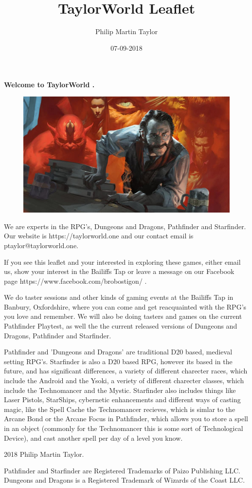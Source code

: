 \documentclass[12pt,a4paper]{book}
\date{07-09-2018}
\author{Philip Martin Taylor}
\title{TaylorWorld Leaflet}
\begin{document}
\begin{center}
\textbf{Welcome to TaylorWorld \texttrademark.}
\end{center}
\begin{figure}[h]
  \centering
  \includegraphics[scale=0.15]{alchemist.jpg}
\end{figure}
\begin{flushleft}
We are experts in the RPG's, Dungeons and Dragons, Pathfinder and Starfinder. Our website is https://taylorworld.one and our contact email is ptaylor@taylorworld.one.
\end{flushleft}
\begin{flushleft}
  If you see this leaflet and your interested in exploring these games, either email us, show your interest in the Bailiffs Tap or leave a message on our Facebook page https://www.facebook.com/brobostigon/ .
\end{flushleft}
\begin{flushleft}
  We do taster sessions and other kinds of gaming events at the Bailiffs Tap in Banbury, Oxfordshire, where you can come and get reacquainted with the RPG's you love and remember. We will also be doing tasters and games on the current Pathfinder Playtest, as well the the current released versions of Dungeons and Dragons, Pathfinder and Starfinder.
\end{flushleft}
\begin{flushleft}
  Pathfinder and 'Dungeons and Dragons' are traditional D20 based, medieval setting RPG's. Starfinder is also a D20 based RPG, however its based in the future, and has significant differences, a variety of different charecter races, which include the Android and the Ysoki, a veriety of different charecter classes, which include the Technomancer and the Mystic. Starfinder also includes things like Laser Pistols, StarShips, cybernetic enhancements and different ways of casting magic, like the Spell Cache the Technomancer recieves, which is simlar to the Arcane Bond or the Arcane Focus in Pathfinder, which allows you to store a spell in an object (commonly for the Technomancer this is some sort of Technological Device), and cast another spell per day of a level you know.
\end{flushleft}
\begin{center}
  \textcopyright{} 2018 Philip Martin Taylor.
\end{center}
\begin{center}
  Pathfinder and Starfinder are Registered Trademarks of Paizo Publishing LLC. Dungeons and Dragons is a Registered Trademark of Wizards of the Coast LLC.
\end{center}
\end{document}
